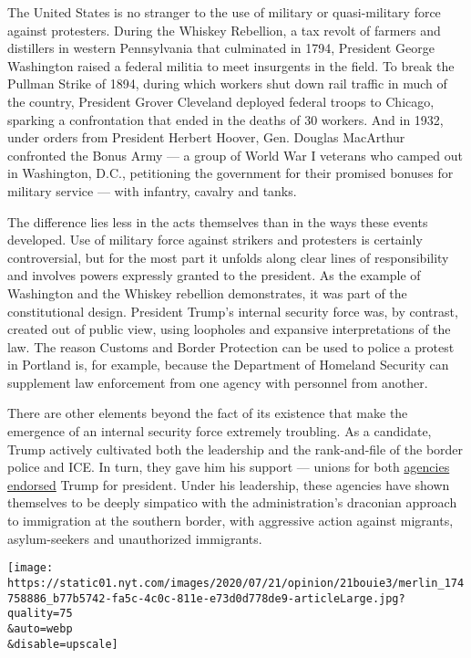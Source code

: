 The United States is no stranger to the use of military or
quasi-military force against protesters. During the Whiskey Rebellion, a
tax revolt of farmers and distillers in western Pennsylvania that
culminated in 1794, President George Washington raised a federal militia
to meet insurgents in the field. To break the Pullman Strike of 1894,
during which workers shut down rail traffic in much of the country,
President Grover Cleveland deployed federal troops to Chicago, sparking
a confrontation that ended in the deaths of 30 workers. And in 1932,
under orders from President Herbert Hoover, Gen. Douglas MacArthur
confronted the Bonus Army --- a group of World War I veterans who camped
out in Washington, D.C., petitioning the government for their promised
bonuses for military service --- with infantry, cavalry and tanks.

The difference lies less in the acts themselves than in the ways these
events developed. Use of military force against strikers and protesters
is certainly controversial, but for the most part it unfolds along clear
lines of responsibility and involves powers expressly granted to the
president. As the example of Washington and the Whiskey rebellion
demonstrates, it was part of the constitutional design. President
Trump's internal security force was, by contrast, created out of public
view, using loopholes and expansive interpretations of the law. The
reason Customs and Border Protection can be used to police a protest in
Portland is, for example, because the Department of Homeland Security
can supplement law enforcement from one agency with personnel from
another.

There are other elements beyond the fact of its existence that make the
emergence of an internal security force extremely troubling. As a
candidate, Trump actively cultivated both the leadership and the
rank-and-file of the border police and ICE. In turn, they gave him his
support --- unions for both
\href{https://www.npr.org/2016/03/30/472420387/border-patrol-union-endorses-donald-trump}{agencies}
\href{https://www.politico.com/story/2016/09/immigration-customs-enforcement-union-endorses-trump-228664}{endorsed}
Trump for president. Under his leadership, these agencies have shown
themselves to be deeply simpatico with the administration's draconian
approach to immigration at the southern border, with aggressive action
against migrants, asylum-seekers and unauthorized immigrants.

\texttt{[image: https://static01.nyt.com/images/2020/07/21/opinion/21bouie3/merlin\_174758886\_b77b5742-fa5c-4c0c-811e-e73d0d778de9-articleLarge.jpg?quality=75\\\&auto=webp\\\&disable=upscale]}

